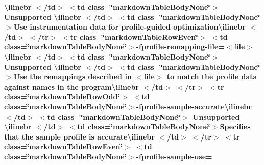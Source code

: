 \begin{longtabu}
{\bfseries{{\ttfamily \textbackslash{}ilinebr \texorpdfstring{$<$}{<}/td\texorpdfstring{$>$}{>} \texorpdfstring{$<$}{<}td class=\char`\"{}markdown\+Table\+Body\+None\char`\"{}\texorpdfstring{$>$}{>} Unsupported \textbackslash{}ilinebr \texorpdfstring{$<$}{<}/td\texorpdfstring{$>$}{>} \texorpdfstring{$<$}{<}td class=\char`\"{}markdown\+Table\+Body\+None\char`\"{}\texorpdfstring{$>$}{>}}Use instrumentation data for profile-\/guided optimization{\ttfamily \textbackslash{}ilinebr \texorpdfstring{$<$}{<}/td\texorpdfstring{$>$}{>} \texorpdfstring{$<$}{<}/tr\texorpdfstring{$>$}{>} \texorpdfstring{$<$}{<}tr class=\char`\"{}markdown\+Table\+Row\+Even\char`\"{}\texorpdfstring{$>$}{>} \texorpdfstring{$<$}{<}td class=\char`\"{}markdown\+Table\+Body\+None\char`\"{}\texorpdfstring{$>$}{>}}-\/fprofile-\/remapping-\/file=$<$file$>${\ttfamily \textbackslash{}ilinebr \texorpdfstring{$<$}{<}/td\texorpdfstring{$>$}{>} \texorpdfstring{$<$}{<}td class=\char`\"{}markdown\+Table\+Body\+None\char`\"{}\texorpdfstring{$>$}{>} Unsupported \textbackslash{}ilinebr \texorpdfstring{$<$}{<}/td\texorpdfstring{$>$}{>} \texorpdfstring{$<$}{<}td class=\char`\"{}markdown\+Table\+Body\+None\char`\"{}\texorpdfstring{$>$}{>}}Use the remappings described in $<$file$>$ to match the profile data against names in the program{\ttfamily \textbackslash{}ilinebr \texorpdfstring{$<$}{<}/td\texorpdfstring{$>$}{>} \texorpdfstring{$<$}{<}/tr\texorpdfstring{$>$}{>} \texorpdfstring{$<$}{<}tr class=\char`\"{}markdown\+Table\+Row\+Odd\char`\"{}\texorpdfstring{$>$}{>} \texorpdfstring{$<$}{<}td class=\char`\"{}markdown\+Table\+Body\+None\char`\"{}\texorpdfstring{$>$}{>}}-\/fprofile-\/sample-\/accurate{\ttfamily \textbackslash{}ilinebr \texorpdfstring{$<$}{<}/td\texorpdfstring{$>$}{>} \texorpdfstring{$<$}{<}td class=\char`\"{}markdown\+Table\+Body\+None\char`\"{}\texorpdfstring{$>$}{>} Unsupported \textbackslash{}ilinebr \texorpdfstring{$<$}{<}/td\texorpdfstring{$>$}{>} \texorpdfstring{$<$}{<}td class=\char`\"{}markdown\+Table\+Body\+None\char`\"{}\texorpdfstring{$>$}{>}}Specifies that the sample profile is accurate{\ttfamily \textbackslash{}ilinebr \texorpdfstring{$<$}{<}/td\texorpdfstring{$>$}{>} \texorpdfstring{$<$}{<}/tr\texorpdfstring{$>$}{>} \texorpdfstring{$<$}{<}tr class=\char`\"{}markdown\+Table\+Row\+Even\char`\"{}\texorpdfstring{$>$}{>} \texorpdfstring{$<$}{<}td class=\char`\"{}markdown\+Table\+Body\+None\char`\"{}\texorpdfstring{$>$}{>}}-\/fprofile-\/sample-\/use=}}


\end{longtabu}
